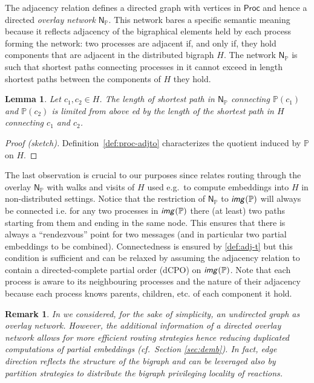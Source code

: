 \documentclass[a4paper,english,10pt]{article}
\theoremstyle{plain}\newtheorem{theorem}{Theorem}
\theoremstyle{plain}\newtheorem{corollary}[theorem]{Corollary}
\theoremstyle{plain}\newtheorem{proposition}[theorem]{Proposition}
\theoremstyle{plain}\newtheorem{lemma}[theorem]{Lemma}
\theoremstyle{plain}\newtheorem{definition}{Definition}
\theoremstyle{plain}\newtheorem{remark}{Remark}
\theoremstyle{plain}\newtheorem{example}[remark]{Example}
\newcommand{\?}[1]{}
\newcommand{\rng}{\textsf{\textit{img}}}
\newcommand{\mbb}[1]{\mathbb{#1}}
\newcommand{\msf}[1]{\mathsf{#1}}
\newcommand{\prt}{\mbb}
\begin{document}
The adjacency relation defines a directed graph with vertices in $\msf{Proc}$
and hence a directed \emph{overlay network} $\msf N_\prt P$. 
This network bares a specific semantic meaning because it reflects adjacency 
of the bigraphical elements held by each process forming the network: 
two processes are adjacent if, and only if, they hold components that
are adjacent in the distributed bigraph $H$. The network $\msf N_\prt P$
is such that shortest paths connecting processes in it cannot exceed
in length shortest paths between the components of $H$ they hold.
\begin{lemma}
	Let $c_1, c_2 \in H$. The length of shortest path in $\msf N_\prt P$
	connecting $\prt P(c_1)$ and $\prt P(c_2)$ is limited from above ed by the length
	of the shortest path in $H$ connecting $c_1$ and $c_2$.
\end{lemma}
\begin{proof}[Proof (sketch)]
	Definition~\ref{def:proc-adjto} characterizes the quotient
	induced by $\prt P$ on $H$.
\end{proof}
The last observation is crucial to our 
purposes since relates routing through the overlay $\msf N_\prt P$ with walks 
and visits of $H$ used e.g.~to compute embeddings into $H$ in non-distributed
settings. Notice that the restriction of $\msf N_\prt P$ to $\rng(\prt P)$
will always be connected i.e. for any two processes in $\rng(\prt P)$ 
there (at least) two paths starting from them and ending in the same node.
This ensures that there is always a ``rendezvous'' point for two messages
(and in particular two partial embeddings to be combined).
Connectedness is ensured by \ref{def:adj-t} but this condition is sufficient
and can be relaxed by assuming the adjacency relation to contain a 
directed-complete partial order (dCPO) on $\rng(\prt P)$.
Note that each process is aware to its neighbouring processes and the nature
of their adjacency because each process knows parents, children, etc. of each
component it hold.

\begin{remark}
	In \cite{mpm:gcm14w} we considered, for the sake of simplicity, an 
	undirected graph as overlay network. However, the additional information
	of a directed overlay network allows for more efficient routing strategies
	hence reducing duplicated computations of partial embeddings 
	(cf.~Section \ref{sec:demb}). 
	In fact, edge direction reflects the structure of the bigraph
	and can be leveraged also by partition strategies to
	distribute the bigraph privileging locality of reactions.
\end{remark}
\end{document}

